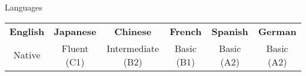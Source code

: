 \documentclass[10pt]{resume} %
\begin{document}
%


\begin{rSection}{Languages}

\begin{center}
\begin{tabular}{ c c c c c c }
 \textbf{English} & \textbf{Japanese} & \textbf{Chinese} & \textbf{French} &
 \textbf{Spanish} & \textbf{German} \\
 Native & Fluent (C1) & Intermediate (B2) & Basic (B1) & Basic (A2) & Basic (A2)
\end{tabular}
\end{center}

\end{rSection}

\end{document}
